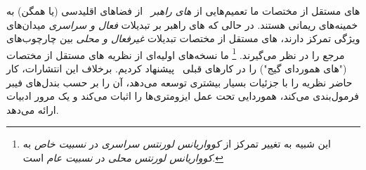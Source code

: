 \CNN{}های مستقل از مختصات ما تعمیم‌هایی از \emph{\CNN{}های راهبر}~\cite{Cohen2017-STEER,3d_steerableCNNs,Weiler2019_E2CNN,Cohen2019-generaltheory,lang2020WignerEckart} از فضاهای اقلیدسی (یا همگن) به خمینه‌های ریمانی هستند.
در حالی که \CNN{}های راهبر بر تبدیلات \emph{فعال و سراسری} میدان‌های ویژگی تمرکز دارند، \CNN{}های مستقل از مختصات تبدیلات \emph{غیرفعال و محلی} بین چارچوب‌های مرجع را در نظر می‌گیرند.%
\footnote{
	این شبیه به تغییر تمرکز از \emph{کوواریانس لورنتس سراسری} در \emph{نسبیت خاص} به \emph{کوواریانس لورنتس محلی} در \emph{نسبیت عام} است.
}
ما نسخه‌های اولیه‌ای از نظریه \CNN{}های مستقل از مختصات ("\CNN{}های هموردای گیج") را در کارهای قبلی~\cite{gaugeIco2019,deHaan2020meshCNNs} پیشنهاد کردیم.
برخلاف این انتشارات، کار حاضر نظریه را با جزئیات بسیار بیشتری توسعه می‌دهد، آن را بر حسب بندل‌های فیبر فرمول‌بندی می‌کند، هموردایی تحت عمل ایزومتری‌ها را اثبات می‌کند و یک مرور ادبیات ارائه می‌دهد.